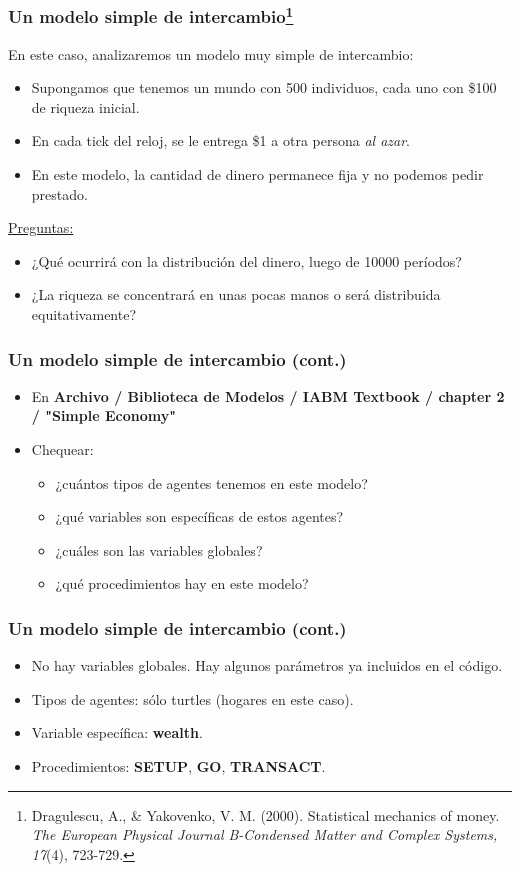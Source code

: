\documentclass[11pt]{beamer}
\begin{document}
\begin{frame}
\frametitle{Un modelo simple de intercambio\footnote{ \scriptsize{Dragulescu, A., \& Yakovenko, V. M. (2000). Statistical mechanics of money. \textit{The European Physical Journal B-Condensed Matter and Complex Systems, 17}(4), 723-729.}}}
En este caso, analizaremos un modelo muy simple de intercambio:
\begin{itemize}
	\item Supongamos que tenemos un mundo con 500 individuos, cada uno con \$100 de riqueza inicial.
	\item En cada tick del reloj, se le entrega \$1 a otra persona \textit{al azar}.
	\item En este modelo, la cantidad de dinero permanece fija y no podemos pedir prestado. 
\end{itemize}
\underline{Preguntas:}
\begin{itemize}
	\item ¿Qué ocurrirá con la distribución del dinero, luego de 10000 períodos? 
	\item ¿La riqueza se concentrará en unas pocas manos o será distribuida equitativamente?
\end{itemize}
\end{frame}

\begin{frame}
\frametitle{Un modelo simple de intercambio (cont.)}
\begin{itemize}
	\item En \textbf{Archivo / Biblioteca de Modelos / IABM Textbook / chapter 2 / "Simple Economy"}
	\item Chequear:
	\begin{itemize}
		\item ¿cuántos tipos de agentes tenemos en este modelo?
		\item ¿qué variables son específicas de estos agentes? 
		\item ¿cuáles son las variables globales?
		\item ¿qué procedimientos hay en este modelo?
	\end{itemize}
\end{itemize}	
\end{frame}

\begin{frame}
\frametitle{Un modelo simple de intercambio (cont.)}
\begin{itemize}
\item No hay variables globales. Hay algunos parámetros ya incluidos en el código.
\item Tipos de agentes: sólo turtles (hogares en este caso).
\item Variable específica: \textbf{wealth}.
\item Procedimientos: \textbf{SETUP}, \textbf{GO}, \textbf{TRANSACT}.
\end{itemize}	
\end{frame}
\end{document}
